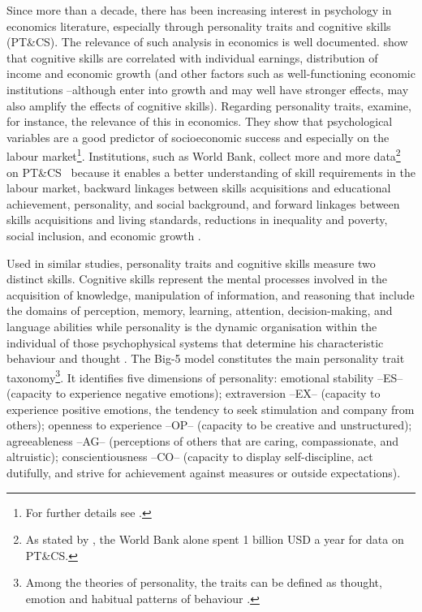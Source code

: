\documentclass[a4paper, 12pt, onecolumn]{article}
\newcommand{\PTCS}{PT\&CS}
\begin{document}
Since more than a decade, there has been increasing interest in psychology in economics literature, especially through personality traits and cognitive skills (\PTCS).
The relevance of such analysis in economics is well documented.
\cite{Hanushek2008} show that cognitive skills are correlated with individual earnings, distribution of income and economic growth (and other factors such as well-functioning economic institutions --although enter into growth and may well have stronger effects, may also amplify the effects of cognitive skills).
Regarding personality traits, \cite{Borghans2008} examine, for instance, the relevance of this in economics.
They show that psychological variables are a good predictor of socioeconomic success and especially on the labour market\footnote{For further details see \cite{Almlund2011}.}. %
Institutions, such as World Bank, collect more and more data\footnote{As stated by \cite{Laajaj2019b}, the World Bank alone spent 1 billion USD a year for data on \PTCS.} on \PTCS~ because it enables a better understanding of skill requirements in the labour market, backward linkages between skills acquisitions and educational achievement, personality, and social background, and forward linkages between skills acquisitions and living standards, reductions in inequality and poverty, social inclusion, and economic growth \citep{STEP2014}.

Used in similar studies, personality traits and cognitive skills measure two distinct skills.
Cognitive skills represent the mental processes involved in the acquisition of knowledge, manipulation of information, and reasoning that include the domains of perception, memory, learning, attention, decision-making, and language abilities \citep{Kiely2014} while personality is the dynamic organisation within the individual of those psychophysical systems that determine his characteristic behaviour and thought \citep{Allport1961}.
The Big-5 model constitutes the main personality trait taxonomy\footnote{Among the theories of personality, the traits can be defined as thought, emotion and habitual patterns of behaviour \citep{Kassin2003}.}.
It identifies five dimensions of personality: emotional stability --ES-- (capacity to experience negative emotions); extraversion --EX-- (capacity to experience positive emotions, the tendency to seek stimulation and company from others); openness to experience --OP-- (capacity to be creative and unstructured); agreeableness --AG-- (perceptions of others that are caring, compassionate, and altruistic); conscientiousness --CO-- (capacity to display self-discipline, act dutifully, and strive for achievement against measures or outside expectations).	
\end{document}

